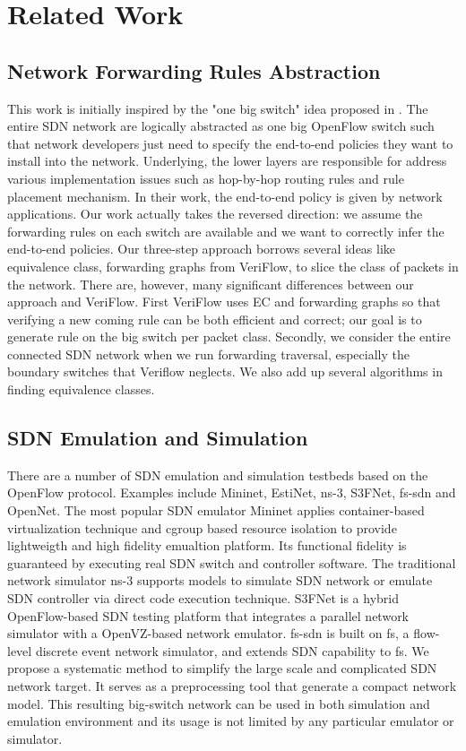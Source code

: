 \section{Related Work}

\subsection{Network Forwarding Rules Abstraction}
This work is initially inspired by the "one big switch" idea proposed
in \cite{OneBigSwitchAbstraction}.
The entire SDN network are logically abstracted as one big OpenFlow switch such
that network developers just need to specify the end-to-end policies they want
to install into the network.
Underlying, the lower layers are responsible for address various implementation
issues such as hop-by-hop routing rules and rule placement mechanism.
In their work, the end-to-end policy is given by network applications.
Our work actually takes the reversed direction: we assume the forwarding rules on each
switch are available and we want to correctly infer the end-to-end policies.
Our three-step approach borrows several ideas like equivalence class, forwarding graphs
from VeriFlow\cite{Veriflow}, to slice the class of packets in the network.
There are, however, many significant differences between our approach and VeriFlow.
First VeriFlow uses EC and forwarding graphs so that verifying a new coming rule can be
both efficient and correct;
our goal is to generate rule on the big switch per packet class.
Secondly, we consider the entire connected SDN network when we run forwarding traversal,
especially the boundary switches that Veriflow neglects.
We also add up several algorithms in finding equivalence classes.

\subsection{SDN Emulation and Simulation}
There are a number of SDN emulation and simulation testbeds based on the OpenFlow
protocol.
Examples include Mininet\cite{Mininet}, EstiNet\cite{Estinet}, ns-3\cite{NS3},
S3FNet\cite{S3F}, fs-sdn\cite{FSSDN} and OpenNet\cite{OpenNet}.
The most popular SDN emulator Mininet applies container-based virtualization technique
and cgroup based resource isolation to provide lightweigth and high fidelity emualtion
platform.
Its functional fidelity is guaranteed by executing real SDN switch and controller software.
The traditional network simulator ns-3 supports models to simulate SDN network or emulate SDN
controller via direct code execution technique.
S3FNet is a hybrid OpenFlow-based SDN testing platform that integrates a parallel
network simulator with a OpenVZ-based network emulator.
fs-sdn is built on fs, a flow-level discrete event network simulator, and extends SDN
capability to fs.
We propose a systematic method to simplify the large scale and complicated SDN network target.
It serves as a preprocessing tool that generate a compact network model.
This resulting big-switch network can be used in both simulation and emulation environment
and its usage is not limited by any particular emulator or simulator.

